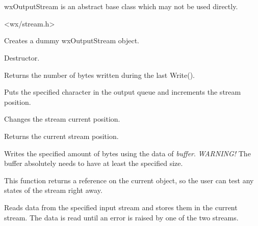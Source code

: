 \section{}\label{wxoutputstream}

wxOutputStream is an abstract base class which may not be used directly.




<wx/stream.h>




Creates a dummy wxOutputStream object.



Destructor.



Returns the number of bytes written during the last Write().



Puts the specified character in the output queue and increments the
stream position.



Changes the stream current position.



Returns the current stream position.



Writes the specified amount of bytes using the data of {\it buffer}. 
{\it WARNING!} The buffer absolutely needs to have at least the specified size.

This function returns a reference on the current object, so the user can test
any states of the stream right away.


Reads data from the specified input stream and stores them 
in the current stream. The data is read until an error is raised
by one of the two streams.


